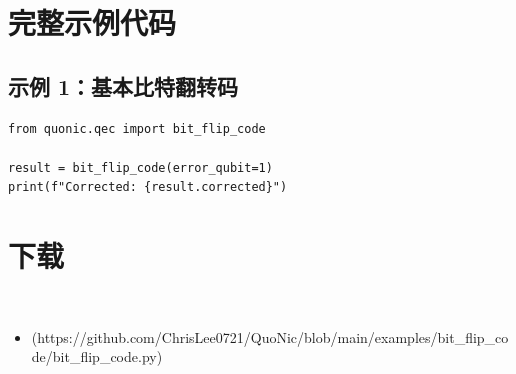 \documentclass[12pt,a4paper]{article}
\begin{document}
\section{完整示例代码}

\subsection{示例 1：基本比特翻转码}

\begin{lstlisting}[style=python]
from quonic.qec import bit_flip_code

result = bit_flip_code(error_qubit=1)
print(f"Corrected: {result.corrected}")
\end{lstlisting}


\section{下载}

\begin{itemize}
  \item [bit_flip_code.py](https://github.com/ChrisLee0721/QuoNic/blob/main/examples/bit_flip_code/bit_flip_code.py)
\end{itemize}
\end{document}
